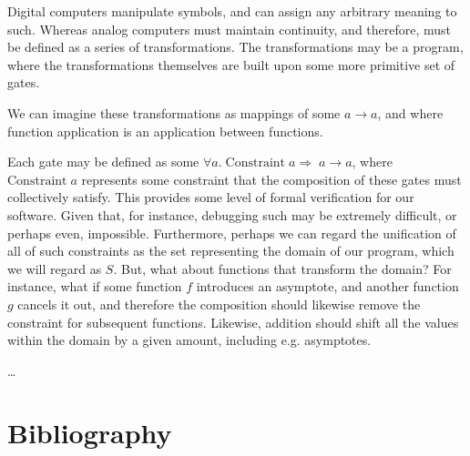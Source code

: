 Digital computers manipulate symbols, and can assign any arbitrary meaning to such. Whereas analog computers must maintain continuity, and therefore, must be defined as a series of transformations. The transformations may be a program, where the transformations themselves are built upon some more primitive set of gates. 

We can imagine these transformations as mappings of some $a\to{a}$, and where function application is an application between functions.

Each gate may be defined as some $\forall{a}.\;\mathrm{Constraint}\;a\Rightarrow\;a\to{a}$, where $\mathrm{Constraint}\;a$ represents some constraint that the composition of these gates must collectively satisfy. This provides some level of formal verification for our software. Given that, for instance, debugging such may be extremely difficult, or perhaps even, impossible. Furthermore, perhaps we can regard the unification of all of such constraints as the set representing the domain of our program, which we will regard as $S$. But, what about functions that transform the domain? For instance, what if some function $f$ introduces an asymptote, and another function $g$ cancels it out, and therefore the composition should likewise remove the constraint for subsequent functions. Likewise, addition should shift all the values within the domain by a given amount, including e.g. asymptotes. 

\dots



\section*{Bibliography}

